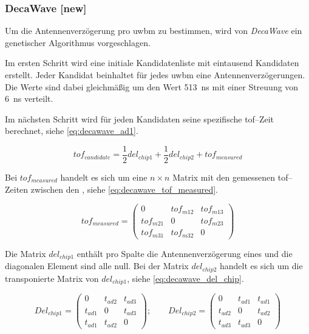 \begin{comment}
--------------------------------------------------------------------------------
\end{comment}
\subsubsection{DecaWave [new]}

Um die Antennenverzögerung pro \Gls{uwbm} zu bestimmen, wird von \textit{DecaWave} ein genetischer Algorithmus vorgeschlagen. \cite{decawave2014calibration}

Im ersten Schritt wird eine initiale Kandidatenliste mit eintausend Kandidaten erstellt. Jeder Kandidat beinhaltet für jedes \Gls{uwbm} eine Antennenverzögerungen. Die Werte sind dabei gleichmäßig um den Wert \SI{513}{\ns} mit einer Streuung von \SI{6}{\ns} verteilt.

Im nächsten Schritt wird für jeden Kandidaten seine spezifische \Gls{tof}--Zeit berechnet, siehe \autoref{eq:decawave_ad1}.

\begin{equation}
tof_{candidate}=\frac12 del_{chip1} + \frac12 del_{chip2} + tof_{measured}\label{eq:decawave_ad1}
\end{equation}

Bei $tof_{measured}$ handelt es sich um eine $n \times n$ Matrix mit den gemessenen \Gls{tof}--Zeiten zwischen den , siehe \autoref{eq:decawave_tof_measured}.

\begin{equation}
tof_{measured} = \begin{pmatrix}0 & tof_{m12} & tof_{m13} \\ tof_{m21} & 0 & tof_{m23} \\ tof_{m31} & tof_{m32} & 0 \end{pmatrix} \label{eq:decawave_tof_measured}
\end{equation}

Die Matrix $del_{chip1}$ enthält pro Spalte die Antennenverzögerung eines  und die diagonalen Element sind alle null. Bei der Matrix $del_{chip2}$ handelt es sich um die transponierte Matrix von $del_{chip1}$, siehe \autoref{eq:decawave_del_chip}.

\begin{equation}
Del_{chip1} = \begin{pmatrix}0 & t_{ad2} & t_{ad3} \\ t_{ad1} & 0 & t_{ad3} \\ t_{ad1} & t_{ad2} & 0 \end{pmatrix}; \qquad Del_{chip2} = \begin{pmatrix}0 & t_{ad1} & t_{ad1} \\ t_{ad2} & 0 & t_{ad2} \\ t_{ad3} & t_{ad3} & 0 \end{pmatrix} \label{eq:decawave_del_chip}
\end{equation}

